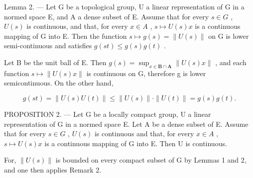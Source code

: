 Lemma 2. --- Let G be a topological group, U a linear representation of G in a normed space E, and A a dense subset of E. Assume that for every \(s \in G\) , \(U(s)\) is continuous, and that, for every \(x \in A\) , \(s \mapsto U(s)x\) is a continuous mapping of G into E. Then the function \(s \mapsto g(s) = \|U(s)\|\) on G is lower semi-continuous and satisfies \(g(st) \leqslant g(s)g(t)\) .

Let B be the unit ball of E. Then \(g(s) = \sup_{x \in \mathbf{B} \cap \mathbf{A}} \|U(s)x\|\) , and each function \(s \mapsto \|U(s)x\|\) is continuous on G, therefore g is lower semicontinuous. On the other hand,

\[
g (s t) = \| U (s) U (t) \| \leqslant \| U (s) \| \cdot \| U (t) \| = g (s) g (t).
\]

PROPOSITION 2. --- Let G be a locally compact group, U a linear representation of G in a normed space E. Let A be a dense subset of E. Assume that for every \(s \in G\) , \(U(s)\) is continuous and that, for every \(x \in A\) , \(s \mapsto U(s)x\) is a continuous mapping of G into E. Then U is continuous.

For, \(\|U(s)\|\) is bounded on every compact subset of G by Lemmas 1 and 2, and one then applies Remark 2.

